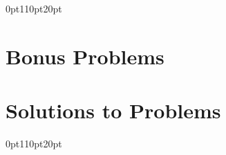 \documentclass[letterpaper,11pt]{book}
\begin{document}




\backmatter{}

\titleformat{\chapter}[display]
{\normalfont\huge\bfseries\sffamily}{}{25pt}{\chaptitlenonumber}
\titlespacing*{\chapter} {0pt}{110pt}{20pt}

\chapter[\bf Bonus Problems]{Bonus Problems}

\addnewlinetotoc{}
\newpage{}


\chapter[\bf Solutions to Problems]{Solutions to Problems}


\clearpage


\titleformat{\chapter}[display]
{\normalfont\huge\bfseries\sffamily}{}{25pt}{\chaptitlenonumber}
\titlespacing*{\chapter} {0pt}{110pt}{20pt}





\end{document}
